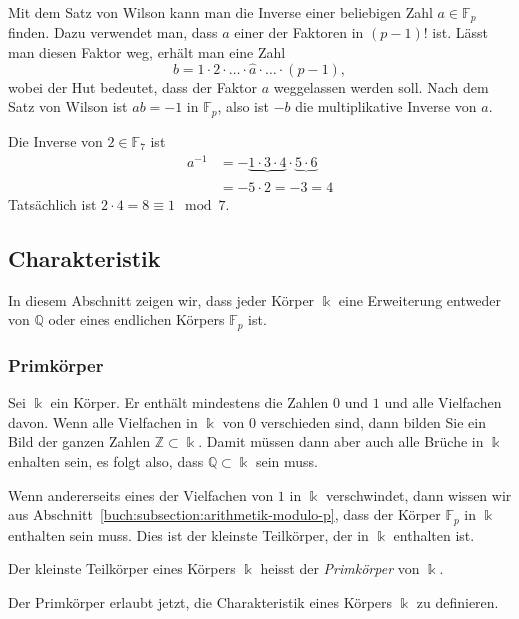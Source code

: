 Mit dem Satz von Wilson kann man die Inverse einer beliebigen Zahl
$a\in\mathbb{F}_p$ finden.
Dazu verwendet man, dass $a$ einer der Faktoren in $(p-1)!$ ist.
Lässt man diesen Faktor weg, erhält man eine Zahl
\[
b = 1\cdot 2 \cdot \ldots\cdot \hat{a}\cdot\ldots\cdot (p-1),
\]
wobei der Hut bedeutet, dass der Faktor $a$ weggelassen werden soll.
Nach dem Satz von Wilson ist $ab=-1$ in $\mathbb{F}_p$, also ist
$-b$ die multiplikative Inverse  von $a$.

\begin{beispiel}
Die Inverse von $2\in\mathbb{F}_7$ ist
\begin{align*}
a^{-1}
&=
-\underbrace{1\cdot 3\cdot 4}_{}\cdot \underbrace{5\cdot 6}_{}
\\
&=
-5\cdot 2
=
-3
=4
\end{align*}
Tatsächlich ist $2\cdot 4=8\equiv 1\mod 7$.
\end{beispiel}

%
%
\subsection{Charakteristik
\label{buch:subsection:charakteristik}}
In diesem Abschnitt zeigen wir, dass jeder Körper $\Bbbk$ eine Erweiterung
entweder von $\mathbb{Q}$ oder eines endlichen Körpers $\mathbb{F}_p$ ist.

\subsubsection{Primkörper}
Sei $\Bbbk$ ein Körper.
Er enthält mindestens die Zahlen $0$ und $1$ und alle Vielfachen davon.
Wenn alle Vielfachen in $\Bbbk$ von $0$ verschieden sind, dann
bilden Sie ein Bild der ganzen Zahlen $\mathbb{Z}\subset\Bbbk$.
Damit müssen dann aber auch alle Brüche in $\Bbbk$ enhalten sein,
es folgt also, dass $\mathbb{Q}\subset\Bbbk$ sein muss.

Wenn andererseits eines der Vielfachen von $1$ in $\Bbbk$ 
verschwindet, dann wissen wir aus
Abschnitt~\ref{buch:subsection:arithmetik-modulo-p}, dass
der Körper $\mathbb{F}_p$ in $\Bbbk$ enthalten sein muss.
Dies ist der kleinste Teilkörper, der in $\Bbbk$ enthalten ist.

\begin{definition}
Der kleinste Teilkörper eines Körpers $\Bbbk$ heisst der 
{\em Primkörper} von $\Bbbk$.
\end{definition}

Der Primkörper erlaubt jetzt, die Charakteristik eines Körpers $\Bbbk$
zu definieren.


